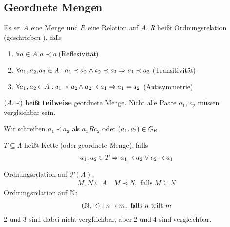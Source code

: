 \subsection{Geordnete Mengen}

\begin{definition}
    Es sei $A$ eine Menge und $R$ eine Relation auf $A$. $R$ heißt Ordnungsrelation (geschrieben \anf{$\prec$}), falls
    \begin{enumerate}[label=(\roman*)]
        \item $\forall a\in A: a \prec a$ (Reflexivität)
        \item $\forall a_1, a_2, a_3\in A: a_1\prec a_2 \land a_2 \prec a_3 \Rightarrow{} a_1 \prec a_3$ (Transitivität)
        \item $\forall a_1, a_2\in A: a_1\prec a_2 \land a_2 \prec a_1 \Rightarrow{} a_1 = a_2$ (Antisymmetrie)
    \end{enumerate}
    $\left(A, \prec\right)$ heißt \textbf{teilweise} geordnete Menge. Nicht alle Paare $a_1$, $a_2$ müssen vergleichbar sein.
\end{definition}

\begin{notation}
    Wir schreiben $a_1\prec a_2$ als $a_{1}Ra_{2}$ oder $\left(a_1, a_2\right)\in G_R$.
\end{notation}
\begin{definition}[Kette]
    $T\subseteq A$ heißt Kette (oder geordnete Menge), falls
    \begin{align*}
        a_1, a_2\in T \Rightarrow{} a_1\prec a_2 \lor a_2 \prec a_1
    \end{align*}
\end{definition}

\begin{beispiel}[Ordnungsrelation]
    Ordnungsrelation auf $\mathcal{P}(A)$:
    \begin{align*}
        M, N \subseteq A \quad M \prec N, \text{ falls } M\subseteq N
    \end{align*}
    \noindent Ordnungsrelation auf $\mathbb{N}$:
    \begin{align*}
    (\mathbb{N}, \prec)
        : n\prec m, \text{ falls $n$ teilt $m$}
    \end{align*}
    $2$ und $3$ sind dabei nicht vergleichbar, aber $2$ und $4$ sind vergleichbar.
\end{beispiel}

\newpage